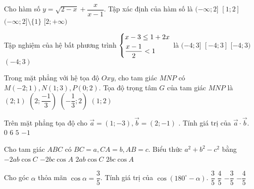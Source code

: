 \begin{ex}%
	Cho hàm số $y=\sqrt{2-x}+\dfrac{x}{x-1}$. Tập xác định của hàm số là
	\choice
	{$(-\infty;2]$}
	{$[1;2]$}
	{\True$(-\infty;2]\setminus\{1\}$}
	{ $[2;+\infty)$}
\end{ex} 
\begin{ex}%
	Tập nghiệm của hệ bất phương trình $\left\{\begin{aligned}&x-3\leq 1+2x \\&\dfrac{x-1}{2}<1\end{aligned}\right.$ là
	\choice
	{$(-4;3]$}
	{$[-4;3]$}
	{\True$[-4;3)$}
	{ $(-4;3)$}
\end{ex} 
\begin{ex}%
	Trong mặt phẳng với hệ tọa độ $Oxy$, cho tam giác $MNP$ có $M(-2;1), N(1;3), P(0;2)$. Tọa độ trọng tâm $G$ của tam giác $MNP$ là
	\choice
	{$(2;1)$}
	{$\left(2;\dfrac{-1}{3}\right) $}
	{\True$\left(-\dfrac{1}{3};2\right)$}
	{ $(1;2)$}
\end{ex} 

\begin{ex}%
	Trên mặt phẳng tọa độ cho $\vec{a}=(1;-3), \vec{b}=(2;-1)$ . Tính giá trị của $\vec{a}\cdot \vec{b}$.
	\choice
	{$0$}
	{$6$}
	{\True$5$}
	{ $-1$}
\end{ex} 

\begin{ex}%
	Cho tam giác $ABC$ có $BC=a, CA=b, AB=c$. Biểu thức $a^2+b^2-c^2$ bằng
	\choice
	{$-2ab \cos C$}
	{$-2bc\cos A$}
	{\True$2ab\cos C$}
	{ $2bc\cos A$}
\end{ex} 

\begin{ex}%
	Cho góc $\alpha$ thỏa mãn $\cos\alpha=\dfrac{3}{5}$. Tính giá trị của $\cos(180^{\circ}-\alpha)$.
	\choice
	{$\dfrac{3}{5}$}
	{$\dfrac{4}{5}$}
	{\True $-\dfrac{3}{5}$}
	{ $-\dfrac{4}{5}$}
\end{ex} 

